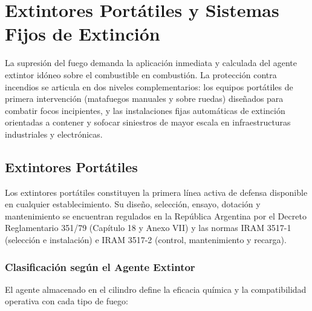\chapter{Extintores Portátiles y Sistemas Fijos de Extinción}
\label{sec.cap6:sistemas_extincion}

La supresión del fuego demanda la aplicación inmediata y calculada del agente extintor idóneo sobre el combustible en
combustión. La protección contra incendios se articula en dos niveles complementarios: los equipos portátiles de primera
intervención (matafuegos manuales y sobre ruedas) diseñados para combatir focos incipientes, y las instalaciones fijas
automáticas de extinción orientadas a contener y sofocar siniestros de mayor escala en infraestructuras industriales y
electrónicas.

\section{Extintores Portátiles}
\label{sec.cap6:extintores}

Los extintores portátiles constituyen la primera línea activa de defensa disponible en cualquier establecimiento. Su
diseño, selección, ensayo, dotación y mantenimiento se encuentran regulados en la República Argentina por el Decreto
Reglamentario 351/79 (Capítulo 18 y Anexo VII) y las normas IRAM 3517-1 (selección e instalación) e IRAM 3517-2
(control, mantenimiento y recarga).

\subsection{Clasificación según el Agente Extintor}

El agente almacenado en el cilindro define la eficacia química y la compatibilidad operativa con cada tipo de fuego:

